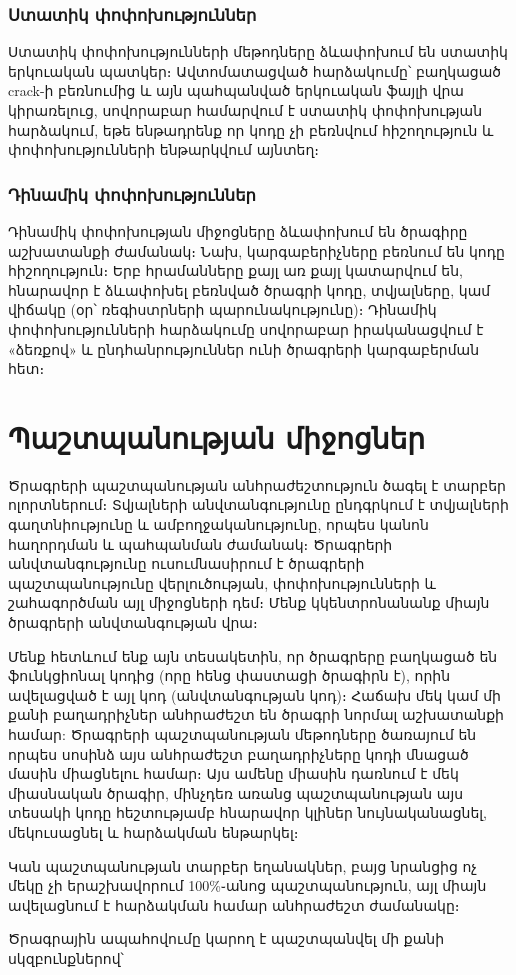 \documentclass[12pt]{article}
\begin{document}
\begin{sloppypar}
\subsubsection{Ստատիկ փոփոխություններ}
Ստատիկ փոփոխությունների մեթոդները ձևափոխում են ստատիկ երկուական պատկեր։
Ավտոմատացված հարձակումը՝ բաղկացած crack-ի բեռնումից և այն պահպանված
երկուական ֆայլի վրա կիրառելուց, սովորաբար համարվում է ստատիկ փոփոխության
հարձակում, եթե ենթադրենք որ կոդը չի բեռնվում հիշողություն և փոփոխությունների
ենթարկվում այնտեղ։

\subsubsection{Դինամիկ փոփոխություններ}
Դինամիկ փոփոխության միջոցները ձևափոխում են ծրագիրը աշխատանքի ժամանակ։
Նախ, կարգաբերիչները բեռնում են կոդը հիշողություն։ Երբ հրամանները քայլ առ քայլ
կատարվում են, հնարավոր է ձևափոխել բեռնված ծրագրի կոդը, տվյալները, կամ վիճակը
(օր՝ ռեգիստրների պարունակությունը)։ Դինամիկ փոփոխությունների հարձակումը
սովորաբար իրականացվում է «ձեռքով» և ընդհանրություններ ունի ծրագրերի
կարգաբերման հետ։

\section{Պաշտպանության միջոցներ}
Ծրագրերի պաշտպանության անհրաժեշտություն ծագել է տարբեր ոլորտներում։ Տվյալների
անվտանգությունը ընդգրկում է տվյալների գաղտնիությունը և ամբողջականությունը,
որպես կանոն հաղորդման և պահպանման ժամանակ։ Ծրագրերի անվտանգությունը
ուսումնասիրում է ծրագրերի պաշտպանությունը վերլուծության, փոփոխությունների և
շահագործման այլ միջոցների դեմ։ Մենք կկենտրոնանանք միայն ծրագրերի անվտանգության
վրա։

Մենք հետևում ենք այն տեսակետին, որ ծրագրերը բաղկացած են ֆունկցիոնալ կոդից
(որը հենց փաստացի ծրագիրն է), որին ավելացված է այլ կոդ (անվտանգության կոդ)։
Հաճախ մեկ կամ մի քանի բաղադրիչներ անհրաժեշտ են ծրագրի նորմալ աշխատանքի
համար: Ծրագրերի պաշտպանության մեթոդները ծառայում են որպես սոսինձ այս
անհրաժեշտ բաղադրիչները կոդի մնացած մասին միացնելու համար։ Այս ամենը միասին
դառնում է մեկ միասնական ծրագիր, մինչդեռ առանց պաշտպանության այս տեսակի
կոդը հեշտությամբ հնարավոր կլիներ նույնականացնել, մեկուսացնել և հարձակման
ենթարկել։

Կան պաշտպանության տարբեր եղանակներ, բայց նրանցից ոչ մեկը չի երաշխավորում
100\%֊անոց պաշտպանություն, այլ միայն ավելացնում է հարձակման համար
անհրաժեշտ ժամանակը։

Ծրագրային ապահովումը կարող է պաշտպանվել մի քանի սկզբունքներով՝


\end{sloppypar}
\end{document}
